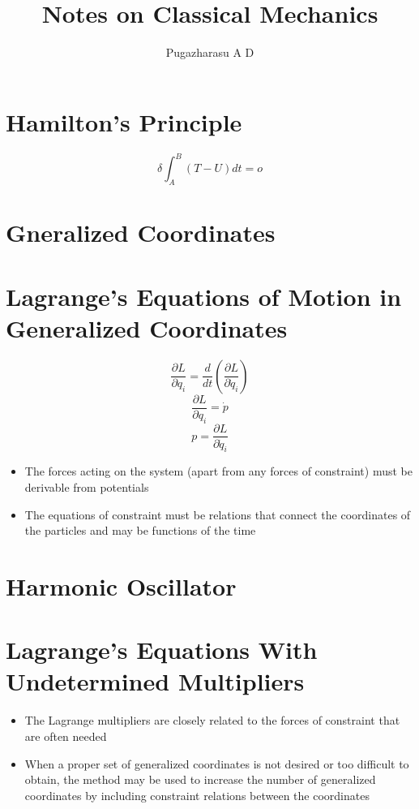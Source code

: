 \documentclass[]{article}
\title{Notes on Classical Mechanics}
\author{Pugazharasu A D}
\begin{document}
\maketitle

\begin{abstract}

\end{abstract}
\pagebreak
\section{Hamilton's Principle}
\begin{equation}
\delta  \int_{A}^{B}( T - U ) dt = o
\end{equation}
\section{Gneralized Coordinates}

\section{Lagrange's Equations of Motion in Generalized Coordinates}
\begin{equation}
\frac{\partial L}{\partial q_{i}} = \frac{d}{dt} \left( \frac{ \partial L}{\partial \dot{q}_{i}} \right)
\end{equation}
\begin{equation}
\frac{\partial L}{\partial q_{i}} = \dot{p}
\end{equation}
$$p = \frac{ \partial L}{\partial \dot{q}_{i}}$$
	\begin{itemize}
	\item The forces acting on the system (apart from any forces of constraint) must be derivable from potentials
	\item The equations of constraint must be relations that connect the coordinates of the particles and may be functions of the time
\end{itemize}
\section{Harmonic Oscillator}
\subsection{}
\subsection{}
\section{Lagrange's Equations With Undetermined Multipliers}
	\begin{itemize}
	\item The Lagrange multipliers are closely related to the forces of constraint that are often needed
	\item When a proper set of generalized coordinates is not desired or too difficult to obtain, the method may be used to increase the number of generalized coordinates by including constraint relations between the coordinates
\end{itemize}
\end{document}
